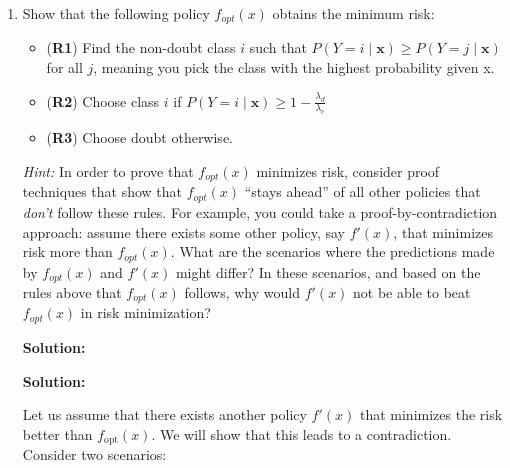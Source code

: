 \documentclass{article}
\renewcommand{\vec}[1]{\boldsymbol{\mathbf{#1}}}
\newenvironment{solution}{\color{blue} \smallskip \textbf{Solution:}}{}
\begin{document}
\begin{enumerate}
\begin{enumerate}[i.]
\begin{solution}
Since the loss is the same for all classes \(i\) when \(f(\mathbf{x}) = c + 1\), we can factor out \(\lambda_d\) in the risk expression: 
\( R(f(\mathbf{x}) = c+1 \mid \mathbf{x}) = \lambda_d \sum_{i=1}^{c} P(Y = i \mid \mathbf{x}) \).

The sum of the posterior probabilities over all classes \(i\) is equal to 1, i.e., \( \sum_{i=1}^{c} P(Y = i \mid \mathbf{x}) = 1 \).

Thus, the risk becomes \( R(f(\mathbf{x}) = c+1 \mid \mathbf{x}) = \lambda_d \cdot 1 = \lambda_d \).




\end{solution}
\end{enumerate}

\newpage
\item Show that the following policy $f_{opt}(x)$ obtains the minimum risk:
\begin{itemize}
    \item (\textbf{R1}) Find the non-doubt class $i$ such that $P(Y=i \mid \vec{x}) \geq P(Y=j \mid \vec{x})$ for all $j$, meaning you pick the class with the highest probability given x.
    \item (\textbf{R2}) Choose class $i$ if $P(Y=i \mid \vec{x}) \geq 1 - \frac{\lambda_d}{\lambda_c}$
    \item (\textbf{R3}) Choose doubt otherwise.
\end{itemize}
	
\textit{Hint:} In order to prove that $f_{opt}(x)$ minimizes risk, consider proof techniques that show that $f_{opt}(x)$ ``stays ahead'' of all other policies that \textit{don't} follow these rules. For example, you could take a proof-by-contradiction approach: assume there exists some other policy, say $f'(x)$, that minimizes risk more than $f_{opt}(x)$. What are the scenarios where the predictions made by $f_{opt}(x)$ and $f'(x)$ might differ? In these scenarios, and based on the rules above that $f_{opt}(x)$ follows, why would $f'(x)$ not be able to beat $f_{opt}(x)$ in risk minimization?

\begin{solution}


\textbf{Solution:}


Let us assume that there exists another policy \(f'(x)\) that minimizes the risk better than \(f_{\text{opt}}(x)\). We will show that this leads to a contradiction.\\

Consider two scenarios:


\end{solution}
\end{enumerate}
\end{document}
